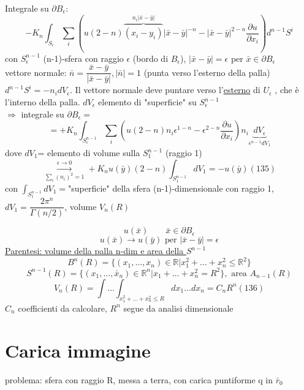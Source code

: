 \documentclass[a4paper,11pt]{report}
\newcommand{\R}{\mathbb{R}}
\newcommand{\Rn}{\mathbb{R}^n}
\newcommand{\x}{\bar{x}}
\newcommand{\y}{\bar{y}}
\begin{document}
Integrale su $\partial B_\epsilon$:
$$
-K_n\int_{S_\epsilon}\sum_i\left(u(2-n)\overset{n_i |\x - \y|}{\overbrace{(x_i-y_i)}}|\x - \y|^{-n}-|\x-\y|^{2-n}\dfrac{\partial u}{\partial x_i}\right) d^{n-1}S^i
$$
con $S_\epsilon^{n-1}$ (n-1)-sfera con raggio $\epsilon$ (bordo di $B_\epsilon$), $|\x-\y|=\epsilon$ per $\x \in \partial B_\epsilon$\\
vettore normale: $\bar{n}=\dfrac{\x - \y}{|\x-\y|}, |\bar{n}|=1$ (punta verso l'esterno della palla)\\
$d^{n-1}S^i= - n_idV_\epsilon$. Il vettore normale deve puntare verso l'\underline{esterno} di $U_\epsilon$ , che è l'interno della palla. $dV_\epsilon$ elemento di "superficie" su $S^{n-1}_\epsilon$\\
$ \Rightarrow $ integrale su $\partial B_\epsilon=$
$$
=+K_n\int_{S_\epsilon^{n-1}} \sum_i \left(u(2-n)n_i\epsilon^{1-n}-\epsilon^{2-n}\dfrac{\partial u}{\partial x_i}\right)n_i\underset{\epsilon^{n-1}dV_1}{\underbrace{dV_\epsilon}}
$$
dove $dV_1$= elemento di volume sulla $S_1^{n-1}$ (raggio 1)
\begin{equation}
\overset{\epsilon \to 0}{\underset{\sum_i (n_i)^2=1}{\longrightarrow}}+K_n u(\y)(2-n)\int_{S_1^{n-1}}dV_1=-u(\y) (135)
\end{equation}
con $\int_{S_1^{n-1}}dV_1=$"superficie" della sfera (n-1)-dimensionale con raggio 1,  $dV_1=\dfrac{2\pi^{n}}{\Gamma(n/2)}$, volume $V_n(R)$

$$
u(\x) \qquad \x \in \partial B_\epsilon
$$
$$
u(\x)\to u(\y) \text{ per } |\x - \y|=\epsilon
$$
\underline{Parentesi: volume della palla n-dim e area della $S^{n-1}$}
$$
B^n(R)=\{(x_1,\dots,x_n)\in \R |x_1^2 + \dots + x_n^2\leq \R^2\}
$$
$$
S^{n-1}(R)=\{(x_1,\dots,\x_n)\in\Rn | x_1 + \dots + x_n^2=R^2 \}, \text{ area $A_{n-1}(R)$}
$$
\begin{equation}
V_n(R)=\int\dots \int_{x_1^2 + \dots + x_n^2 \leq R} dx_1\dots dx_n = C_n R^n (136)
\end{equation}
$C_n$ coefficienti da calcolare, $R^n$ segue da analisi dimensionale



















\chapter{Carica immagine}
problema: sfera con raggio R, messa a terra, con carica puntiforme q in $\bar{r}_0$\\
\end{document}
